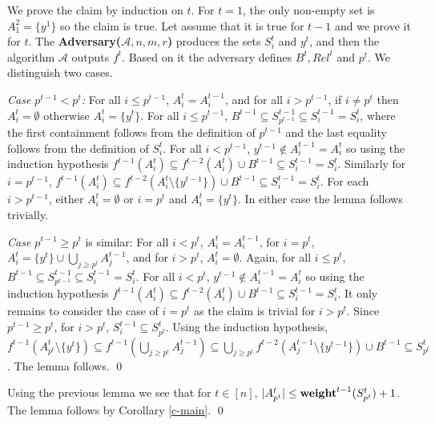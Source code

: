 \documentclass[runningheads,a4paper]{llncs}
\newcommand{\A}{\mathcal{A}}
\newcommand{\weight}{{\rm {\bf weight}}}
\renewenvironment{proof}{\noindent{\it Proof. }} {{\qed}}
\newenvironment{proofof}[1]{\noindent{\it Proof of #1. }} {{\qed}}
\begin{document}
\begin{proof}   %
We prove the claim by induction on $t$. For $t=1$, the only non-empty set is $A^2_1=\{y^1\}$ so the claim is true. 
Let assume that it is true for $t-1$ and we prove it for $t$. 
The {\bf Adversary($\A,n,m,r$)} produces the sets $S^t_i$ and $y^t$, and then the algorithm $\A$ outputs $f^t$.
Based on it the adversary defines $B^t, Rel^t$ and $p^t$.
We distinguish two cases.

\emph{Case $p^{t-1} < p^t$:} For all $i\le p^{t-1}$, $A^{t}_i = A^{t-1}_i$, and for all $i> p^{t-1}$, if $i\not=p^t$ then $A^t_i=\emptyset$
otherwise $A^t_i = \{y^t\}$. For all $i\le p^{t-1}$, $B^{t-1} \subseteq S^{t-1}_{p^{t-1}} \subseteq S^{t-1}_i = S^t_i$, where
the first containment follows from the definition of $p^{t-1}$ and the last equality follows from the definition of $S^t_i$.
For all $i<p^{t-1}$, $y^{t-1} \not\in A^{t-1}_i = A^t_i$ so using the induction hypothesis 
$f^{t-1}(A^t_i) \subseteq f^{t-2}(A^t_i) \cup B^{t-1} \subseteq S^{t-1}_i = S^t_i$.
Similarly for $i=p^{t-1}$, $f^{t-1}(A^t_i) \subseteq f^{t-2}(A^t_i \setminus \{y^{t-1}\}) \cup B^{t-1} \subseteq S^{t-1}_i = S^t_i$.
For each $i>p^{t-1}$, either $A^t_i = \emptyset$ or $i=p^t$ and $A^t_i=\{y^t\}$. In either case the lemma follows trivially.

\emph{Case $p^{t-1} \ge p^t$} is similar: For all $i < p^{t}$, $A^{t}_i = A^{t-1}_i$, for $i=p^t$, $A^t_i = \{y^t\} \cup \bigcup_{j\ge p^t} A^{t-1}_j$,
and for $i>p^t$, $A^t_i=\emptyset$. Again, for all $i\le p^{t}$, $B^{t-1} \subseteq S^{t-1}_{p^{t-1}} \subseteq S^{t-1}_i = S^t_i$.
For all $i<p^{t}$, $y^{t-1} \not\in A^{t-1}_i = A^t_i$ so using the induction hypothesis 
$f^{t-1}(A^t_i) \subseteq f^{t-2}(A^t_i) \cup B^{t-1} \subseteq S^{t-1}_i = S^t_i$.
It only remains to consider the case of $i=p^t$ as the claim is trivial for $i>p^t$.
Since $p^{t-1} \ge p^t$, for $i>p^t$, $S^{t-1}_i \subseteq S^t_{p^t}$.
Using the induction hypothesis, $f^{t-1}(A^t_{p^t} \setminus \{y^t\}) \subseteq f^{t-1}(\bigcup_{j\ge p^t} A^{t-1}_j)
\subseteq \bigcup_{j\ge p^t} f^{t-2}( A^{t-1}_j \setminus \{y^{t-1}\}) \cup B^{t-1} \subseteq S^t_{p^t}$. The lemma follows.
\end{proof}


\begin{proofof}{Lemma \ref{l-b2l}}
Using the previous lemma we see that for $t\in [n]$, $|A^t_{p^t}| \le \weight^{t-1}(S^t_{p^t}) + 1$.
The lemma follows by Corollary \ref{c-main}.
\end{proofof}
\end{document}
